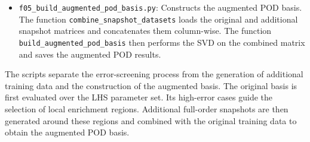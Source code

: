 \begin{itemize}
    The function \texttt{select\_hotspots} applies
    the spatial-diversity criterion to select the
    hotspot centres. The function
    \texttt{build\_augmented\_parameter\_grid}
    generates local parameter combinations around
    these centres and applies the parameter-domain,
    duplicate, and original-grid restrictions.
    Finally,
    \texttt{run\_augmented\_training\_set\_generation}
    solves the additional cases using the
    full-order model, adds their converged
    temperature fields to the augmented snapshot
    dataset, and saves the corresponding records.

    \item \texttt{f05\_build\_augmented\_pod\_basis.py}:
    Constructs the augmented POD basis. The
    function \texttt{combine\_snapshot\_datasets}
    loads the original and additional snapshot
    matrices and concatenates them column-wise.
    The function \texttt{build\_augmented\_pod\_basis}
    then performs the SVD on the combined matrix
    and saves the augmented POD results.

\end{itemize}

The scripts separate the error-screening process
from the generation of additional training data
and the construction of the augmented basis. The
original basis is first evaluated over the LHS
parameter set. Its high-error cases guide the
selection of local enrichment regions. Additional
full-order snapshots are then generated around
these regions and combined with the original
training data to obtain the augmented POD basis.